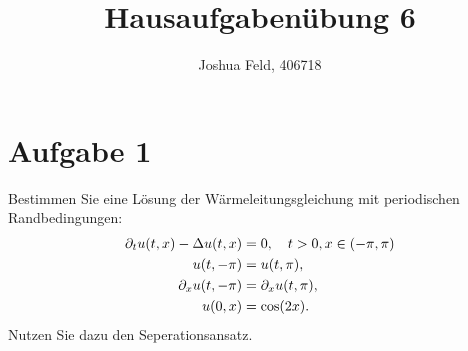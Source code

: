 \documentclass{exercise}
\institute{Applied and Computational Mathematics}
\title{Hausaufgabenübung 6}
\author{Joshua Feld, 406718}
\begin{document}
    \maketitle


    \section*{Aufgabe 1}

    \begin{problem}
        Bestimmen Sie eine Lösung der Wärmeleitungsgleichung mit periodischen Randbedingungen:
        \begin{align*}
            \partial_t u\parentheses*{t, x} - \Delta u\parentheses*{t, x} &= 0, \quad t > 0, x \in \parentheses*{-\pi, \pi}\\
            u\parentheses*{t, -\pi} &= u\parentheses*{t, \pi},\\
            \partial_x u\parentheses*{t, -\pi} &= \partial_x u\parentheses*{t, \pi},\\
            u\parentheses*{0, x} &= \cos\parentheses*{2x}.
        \end{align*}
        Nutzen Sie dazu den Seperationsansatz.
    \end{problem}
\end{document}
